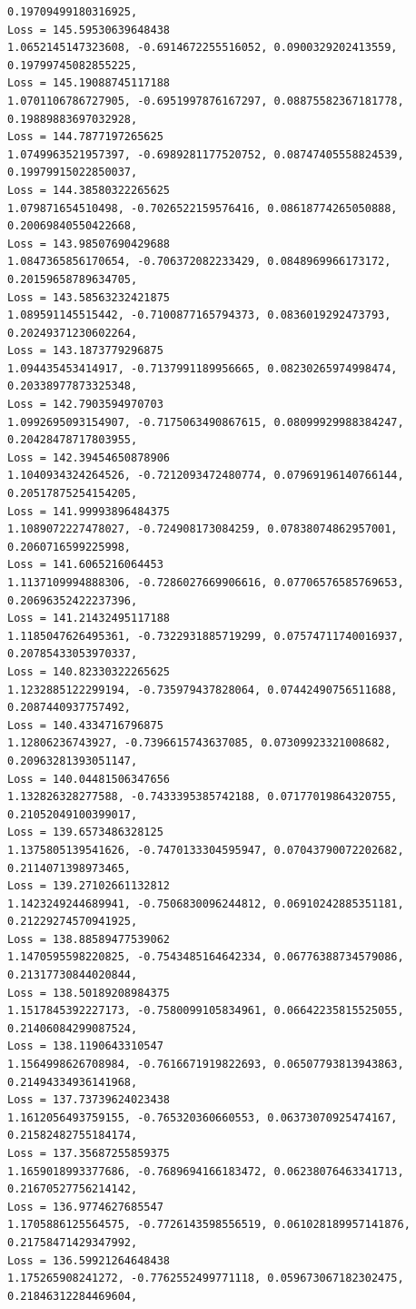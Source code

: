 \documentclass[11pt]{article}
\begin{document}
\begin{Verbatim}[commandchars=\\\{\}]
0.19709499180316925,
Loss = 145.59530639648438
1.0652145147323608, -0.6914672255516052, 0.0900329202413559,
0.19799745082855225,
Loss = 145.19088745117188
1.0701106786727905, -0.6951997876167297, 0.08875582367181778,
0.19889883697032928,
Loss = 144.7877197265625
1.0749963521957397, -0.6989281177520752, 0.08747405558824539,
0.19979915022850037,
Loss = 144.38580322265625
1.079871654510498, -0.7026522159576416, 0.08618774265050888,
0.20069840550422668,
Loss = 143.98507690429688
1.0847365856170654, -0.706372082233429, 0.0848969966173172, 0.20159658789634705,
Loss = 143.58563232421875
1.089591145515442, -0.7100877165794373, 0.0836019292473793, 0.20249371230602264,
Loss = 143.1873779296875
1.094435453414917, -0.7137991189956665, 0.08230265974998474,
0.20338977873325348,
Loss = 142.7903594970703
1.0992695093154907, -0.7175063490867615, 0.08099929988384247,
0.20428478717803955,
Loss = 142.39454650878906
1.1040934324264526, -0.7212093472480774, 0.07969196140766144,
0.20517875254154205,
Loss = 141.99993896484375
1.1089072227478027, -0.724908173084259, 0.07838074862957001, 0.2060716599225998,
Loss = 141.6065216064453
1.1137109994888306, -0.7286027669906616, 0.07706576585769653,
0.20696352422237396,
Loss = 141.21432495117188
1.1185047626495361, -0.7322931885719299, 0.07574711740016937,
0.20785433053970337,
Loss = 140.82330322265625
1.1232885122299194, -0.735979437828064, 0.07442490756511688, 0.2087440937757492,
Loss = 140.4334716796875
1.12806236743927, -0.7396615743637085, 0.07309923321008682, 0.20963281393051147,
Loss = 140.04481506347656
1.132826328277588, -0.7433395385742188, 0.07177019864320755,
0.21052049100399017,
Loss = 139.6573486328125
1.1375805139541626, -0.7470133304595947, 0.07043790072202682,
0.2114071398973465,
Loss = 139.27102661132812
1.1423249244689941, -0.7506830096244812, 0.06910242885351181,
0.21229274570941925,
Loss = 138.88589477539062
1.1470595598220825, -0.7543485164642334, 0.06776388734579086,
0.21317730844020844,
Loss = 138.50189208984375
1.1517845392227173, -0.7580099105834961, 0.06642235815525055,
0.21406084299087524,
Loss = 138.1190643310547
1.1564998626708984, -0.7616671919822693, 0.06507793813943863,
0.21494334936141968,
Loss = 137.73739624023438
1.1612056493759155, -0.765320360660553, 0.06373070925474167,
0.21582482755184174,
Loss = 137.35687255859375
1.1659018993377686, -0.7689694166183472, 0.06238076463341713,
0.21670527756214142,
Loss = 136.9774627685547
1.1705886125564575, -0.7726143598556519, 0.061028189957141876,
0.21758471429347992,
Loss = 136.59921264648438
1.175265908241272, -0.7762552499771118, 0.059673067182302475,
0.21846312284469604,

\end{Verbatim}
\end{document}
